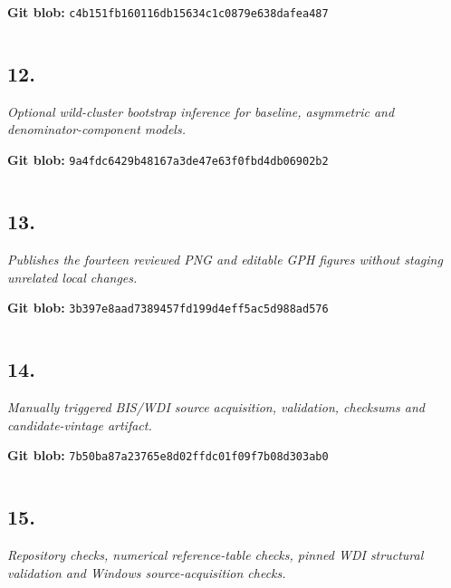 \documentclass[10pt]{article}
\begin{document}
\noindent\textbf{Git blob:} \texttt{c4b151fb160116db15634c1c0879e638dafea487}

\inputminted[linenos,fontsize=\scriptsize,breaklines,breakanywhere]{stata}{replication/balanced_panel_sensitivity.do}


\clearpage
\subsection*{12. \texttt{}}
\textit{Optional wild-cluster bootstrap inference for baseline, asymmetric and denominator-component models.}

\noindent\textbf{Git blob:} \texttt{9a4fdc6429b48167a3de47e63f0fbd4db06902b2}

\inputminted[linenos,fontsize=\scriptsize,breaklines,breakanywhere]{stata}{replication/inference_diagnostics.do}


\clearpage
\subsection*{13. \texttt{}}
\textit{Publishes the fourteen reviewed PNG and editable GPH figures without staging unrelated local changes.}

\noindent\textbf{Git blob:} \texttt{3b397e8aad7389457fd199d4eff5ac5d988ad576}

\inputminted[linenos,fontsize=\scriptsize,breaklines,breakanywhere]{powershell}{replication/publish_reviewed_figures.ps1}


\clearpage
\subsection*{14. \texttt{}}
\textit{Manually triggered BIS/WDI source acquisition, validation, checksums and candidate-vintage artifact.}

\noindent\textbf{Git blob:} \texttt{7b50ba87a23765e8d02ffdc01f09f7b08d303ab0}

\inputminted[linenos,fontsize=\scriptsize,breaklines,breakanywhere]{yaml}{.github/workflows/data-acquisition.yml}


\clearpage
\subsection*{15. \texttt{}}
\textit{Repository checks, numerical reference-table checks, pinned WDI structural validation and Windows source-acquisition checks.}
\end{document}
